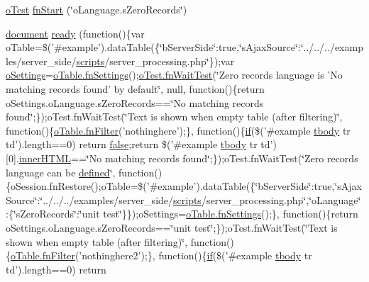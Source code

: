 \begin{DoxyCompactItemize}
\item 
\hyperlink{unit__test_8js_a3b2d259e2df3b6860d9047a92d09d0d6}{o\+Test} \hyperlink{4__server-side_2o_language_8s_zero_records_8js_adb646a74354fdb86b309cebfb4b2fc05}{fn\+Start} (\char`\"{}o\+Language.\+s\+Zero\+Records\char`\"{})
\item 
\hyperlink{outside_events_8js_aa14f8e0338cced6720590fd2ea13bd4b}{document} \hyperlink{4__server-side_2o_language_8s_zero_records_8js_a16cc579a68f03180c8af67300ad32a44}{ready} (function()\{var o\+Table=\$('\#example').data\+Table(\{\char`\"{}b\+Server\+Side\char`\"{}\+:true,\char`\"{}s\+Ajax\+Source\char`\"{}\+:\char`\"{}../../../examples/server\+\_\+side/\hyperlink{tinymce_8jquery_8dev_8js_a09066d4d580eeec222f858d588b4cdef}{scripts}/server\+\_\+processing.\+php\char`\"{}\});var \hyperlink{model_8settings_8js_a4857b9c813b4dea010668e9555d0aca7}{o\+Settings}=\hyperlink{api_8methods_8js_a78f387fab92a85c2cb7830bc5d8a6141}{o\+Table.\+fn\+Settings}();\hyperlink{onhold_24__server-side_2__zero__config_8js_ab25c4d596771c0133cdc45178ce72c3d}{o\+Test.\+fn\+Wait\+Test}(\char`\"{}Zero records language is 'No matching records found' by default\char`\"{}, null, function()\{return o\+Settings.\+o\+Language.\+s\+Zero\+Records==\char`\"{}No matching records found\char`\"{};\});o\+Test.\+fn\+Wait\+Test(\char`\"{}Text is shown when empty table (after filtering)\char`\"{}, function()\{\hyperlink{api_8methods_8js_a7b6987d0a9ab9c5303d10ef62790885d}{o\+Table.\+fn\+Filter}('nothinghere');\}, function()\{\hyperlink{fullpage_2plugin_8js_a8b98017e64ef036adb9ae327ff94abe1}{if}(\$('\#example \hyperlink{core_8constructor_8js_a99b0542c7c50fe8757c55bf9dac5f3be}{tbody} tr td').length==0) return \hyperlink{validate_8js_a5df37b7f02e5cdc7d9412b7f872b8e01}{false};return \$('\#example \hyperlink{core_8constructor_8js_a99b0542c7c50fe8757c55bf9dac5f3be}{tbody} tr td')\mbox{[}0\mbox{]}.\hyperlink{jquery-ui_8js_a87f73c4f0391c1cf9fe60374a76d9a7b}{inner\+H\+T\+M\+L}==\char`\"{}No matching records found\char`\"{};\});o\+Test.\+fn\+Wait\+Test(\char`\"{}Zero records language can be \hyperlink{tinymce_8js_a8cb6212cde9926d156ab5912c9b547cf}{defined}\char`\"{}, function()\{o\+Session.\+fn\+Restore();o\+Table=\$('\#example').data\+Table(\{\char`\"{}b\+Server\+Side\char`\"{}\+:true,\char`\"{}s\+Ajax\+Source\char`\"{}\+:\char`\"{}../../../examples/server\+\_\+side/\hyperlink{tinymce_8jquery_8dev_8js_a09066d4d580eeec222f858d588b4cdef}{scripts}/server\+\_\+processing.\+php\char`\"{},\char`\"{}o\+Language\char`\"{}\+:\{\char`\"{}s\+Zero\+Records\char`\"{}\+:\char`\"{}unit test\char`\"{}\}\});o\+Settings=\hyperlink{api_8methods_8js_a78f387fab92a85c2cb7830bc5d8a6141}{o\+Table.\+fn\+Settings}();\}, function()\{return o\+Settings.\+o\+Language.\+s\+Zero\+Records==\char`\"{}unit test\char`\"{};\});o\+Test.\+fn\+Wait\+Test(\char`\"{}Text is shown when empty table (after filtering)\char`\"{}, function()\{\hyperlink{api_8methods_8js_a7b6987d0a9ab9c5303d10ef62790885d}{o\+Table.\+fn\+Filter}('nothinghere2');\}, function()\{\hyperlink{fullpage_2plugin_8js_a8b98017e64ef036adb9ae327ff94abe1}{if}(\$('\#example \hyperlink{core_8constructor_8js_a99b0542c7c50fe8757c55bf9dac5f3be}{tbody} tr td').length==0) return 
\end{DoxyCompactItemize}
